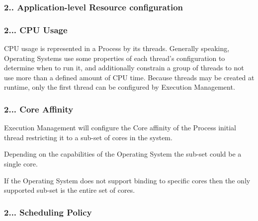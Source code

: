 \subsubsection*{2.. {\bfseries Application-\/level Resource configuration}}

\subsubsection*{2... {\bfseries C\+PU Usage}}


\begin{DoxyItemize}
\item C\+PU usage is represented in a Process by its threads. Generally speaking, Operating Systems use some properties of each thread’s configuration to determine when to run it, and additionally constrain a group of threads to not use more than a defined amount of C\+PU time. Because threads may be created at runtime, only the first thread can be configured by Execution Management.
\end{DoxyItemize}

\subsubsection*{2... {\bfseries Core Affinity}}


\begin{DoxyItemize}
\item Execution Management will configure the Core affinity of the Process initial thread restricting it to a sub-\/set of cores in the system.
\item Depending on the capabilities of the Operating System the sub-\/set could be a single core.
\item If the Operating System does not support binding to specific cores then the only supported sub-\/set is the entire set of cores.
\end{DoxyItemize}

\subsubsection*{2... {\bfseries Scheduling Policy}}


